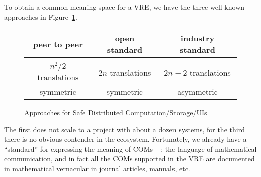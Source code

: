 To obtain a common meaning space for a VRE, we have the three well-known approaches in
Figure~\ref{fig:interop}.
\begin{figure}[ht]\centering
  \begin{tabular}{|c|c|c|}\hline
    peer to peer & open standard & industry standard\\\hline
     &  & \\\hline
    $n^2/2$  translations & $2n$ translations & $2n-2$ translations \\
    symmetric & symmetric & asymmetric\\\hline
  \end{tabular}
  \caption{Approaches for Safe Distributed Computation/Storage/UIs}\label{fig:interop}
\end{figure}
The first does not scale to a project with about a dozen systems, for the third there is
no obvious contender in the \ODK ecosystem. Fortunately, we already have a ``standard'' for
expressing the meaning of COMs -- : the language of
mathematical communication, and in fact all the COMs supported in the \ODK VRE are documented
in mathematical vernacular in journal articles, manuals, etc.

